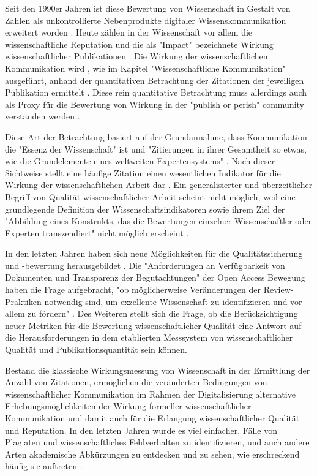 Seit den 1990er Jahren ist diese Bewertung von Wissenschaft in Gestalt von Zahlen als unkontrollierte Nebenprodukte digitaler Wissenskommunikation erweitert worden \cite{angermueller_2010}. Heute zählen in der Wissenschaft vor allem die wissenschaftliche Reputation und die als "Impact" bezeichnete Wirkung wissenschaftlicher Publikationen \cite{herb_open_2013} \cite{Hornbostel_1997}. Die Wirkung der wissenschaftlichen Kommunikation wird , wie im Kapitel "Wissenschaftliche Kommunikation" ausgeführt, anhand der quantitativen Betrachtung der Zitationen der jeweiligen Publikation ermittelt \cite{Brembs_2013} \cite[:16]{haustein_2012_multidimensional} \cite{weller2011twitter}. Diese rein quantitative Betrachtung muss allerdings auch als Proxy für die Bewertung von Wirkung in der "publish or perish" community verstanden werden \cite{peters_2015_research}.

Diese Art der Betrachtung basiert auf der Grundannahme, dass Kommunikation die "Essenz der Wissenschaft" \cite{bonitz_1998_matthaus} ist und "Zitierungen in ihrer Gesamtheit so etwas, wie die Grundelemente eines weltweiten Expertensystems" \cite{bonitz_1990_sci}. Nach dieser Sichtweise stellt eine häufige Zitation einen wesentlichen Indikator für die Wirkung der wissenschaftlichen Arbeit dar \cite{hamilton_1990_publishing}. Ein generalisierter und überzeitlicher Begriff von Qualität wissenschaftlicher Arbeit scheint nicht möglich, weil eine grundlegende Definition der Wissenschaftsindikatoren sowie ihrem Ziel der "Abbildung eines Konstrukts, das die Bewertungen einzelner Wissenschaftler oder Experten transzendiert" nicht möglich erscheint \cite{Hornbostel_1997}.

In den letzten Jahren haben sich neue Möglichkeiten für die Qualitätssicherung und -bewertung herausgebildet \cite{rekdal_2014_academic}. Die "Anforderungen an Verfügbarkeit von Dokumenten und Transparenz der Begutachtungen" der Open Access Bewegung haben die Frage aufgebracht, "ob möglicherweise Veränderungen der Review-Praktiken notwendig sind, um exzellente Wissenschaft zu identifizieren und vor allem zu fördern" \cite{suchen_Hornbostel_2006}. Des Weiteren stellt sich die Frage, ob die Berücksichtigung neuer Metriken für die Bewertung wissenschaftlicher Qualität eine Antwort auf die Herausforderungen in dem etablierten Messsystem von wissenschaftlicher Qualität und Publikationsquantität sein können.

Bestand die klassische Wirkungsmessung von Wissenschaft in der Ermittlung der Anzahl von Zitationen, ermöglichen die veränderten Bedingungen von wissenschaftlicher Kommunikation im Rahmen der Digitalisierung alternative Erhebungsmöglichkeiten der Wirkung formeller wissenschaftlicher Kommunikation und damit auch für die Erlangung wissenschaftlicher Qualität und Reputation. In den letzten Jahren wurde es viel einfacher, Fälle von Plagiaten und wissenschaftliches Fehlverhalten zu identifizieren, und auch andere Arten akademische Abkürzungen zu entdecken und zu sehen, wie erschreckend häufig sie auftreten \cite{rekdal_2014_academic}.

